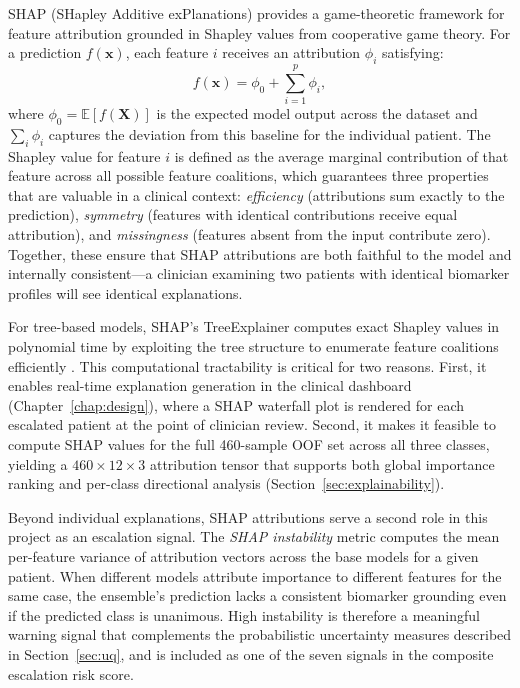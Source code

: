 SHAP (SHapley Additive exPlanations) \citep{lundberg2017shap} provides a
game-theoretic framework for feature attribution grounded in Shapley values from
cooperative game theory. For a prediction $f(\mathbf{x})$, each feature $i$
receives an attribution $\phi_i$ satisfying:
\begin{equation}
  f(\mathbf{x}) = \phi_0 + \sum_{i=1}^{p} \phi_i,
  \label{eq:shap}
\end{equation}
where $\phi_0 = \mathbb{E}[f(\mathbf{X})]$ is the expected model output across
the dataset and $\sum_i \phi_i$ captures the deviation from this baseline for
the individual patient. The Shapley value for feature $i$ is defined as the
average marginal contribution of that feature across all possible feature
coalitions, which guarantees three properties that are valuable in a clinical
context: \emph{efficiency} (attributions sum exactly to the prediction),
\emph{symmetry} (features with identical contributions receive equal
attribution), and \emph{missingness} (features absent from the input contribute
zero). Together, these ensure that SHAP attributions are both faithful to the
model and internally consistent---a clinician examining two patients with
identical biomarker profiles will see identical explanations.

For tree-based models, SHAP's TreeExplainer computes exact Shapley values in
polynomial time by exploiting the tree structure to enumerate feature
coalitions efficiently \citep{lundberg2017shap}. This computational tractability
is critical for two reasons. First, it enables real-time explanation generation
in the clinical dashboard (Chapter~\ref{chap:design}), where a SHAP waterfall
plot is rendered for each escalated patient at the point of clinician review.
Second, it makes it feasible to compute SHAP values for the full 460-sample OOF
set across all three classes, yielding a $460 \times 12 \times 3$ attribution
tensor that supports both global importance ranking and per-class directional
analysis (Section~\ref{sec:explainability}).

Beyond individual explanations, SHAP attributions serve a second role in this
project as an escalation signal. The \emph{SHAP instability} metric computes the
mean per-feature variance of attribution vectors across the base models for a
given patient. When different models attribute importance to different features
for the same case, the ensemble's prediction lacks a consistent biomarker
grounding even if the predicted class is unanimous. High instability is
therefore a meaningful warning signal that complements the probabilistic
uncertainty measures described in Section~\ref{sec:uq}, and is included as one
of the seven signals in the composite escalation risk score.

